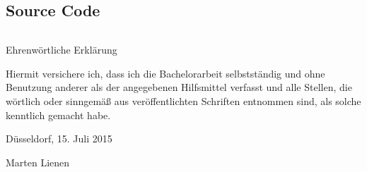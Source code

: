 \documentclass[11pt,a4paper]{book}
\begin{document}
\begin{appendices}
  \chapter{Source Code}
  \label{ch:source}

  \inputminted{julia}{src/Transforms.jl}
\end{appendices}

\printbibliography

\pagestyle{empty}
\cleardoublepage

\vspace*{10em}
{\LARGE Ehrenwörtliche Erklärung}
\vspace{1em}

Hiermit versichere ich, dass ich die Bachelorarbeit selbstständig und ohne
Benutzung anderer als der angegebenen Hilfsmittel verfasst und alle Stellen, die
wörtlich oder sinngemäß aus veröffentlichten Schriften entnommen sind, als
solche kenntlich gemacht habe.

\vspace{5em}

\begin{minipage}{0.4\textwidth}
  \begin{flushleft}
    Düsseldorf, 15. Juli 2015
  \end{flushleft}
\end{minipage}
\hfill
\begin{minipage}{0.4\textwidth}
  \begin{flushright}
    Marten Lienen
  \end{flushright}
\end{minipage}
\end{document}
